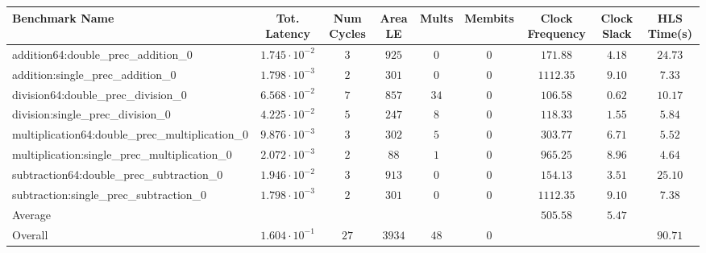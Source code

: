 \begin{tabular}{|l|c|c|c|c|c|c|c|c|}
\hline
Benchmark Name                                   & Tot. Latency            & Num Cycles & Area LE  & Mults  & Membits & Clock Frequency & Clock Slack & HLS Time(s) \\
\hline
addition64:double\_prec\_addition\_0             & $ 1.745 \cdot 10^{-2} $ & $ 3      $ & $ 925  $ & $ 0  $ & $ 0   $ & $ 171.88      $ & $ 4.18    $ & $ 24.73   $ \\
addition:single\_prec\_addition\_0               & $ 1.798 \cdot 10^{-3} $ & $ 2      $ & $ 301  $ & $ 0  $ & $ 0   $ & $ 1112.35     $ & $ 9.10    $ & $ 7.33    $ \\
division64:double\_prec\_division\_0             & $ 6.568 \cdot 10^{-2} $ & $ 7      $ & $ 857  $ & $ 34 $ & $ 0   $ & $ 106.58      $ & $ 0.62    $ & $ 10.17   $ \\
division:single\_prec\_division\_0               & $ 4.225 \cdot 10^{-2} $ & $ 5      $ & $ 247  $ & $ 8  $ & $ 0   $ & $ 118.33      $ & $ 1.55    $ & $ 5.84    $ \\
multiplication64:double\_prec\_multiplication\_0 & $ 9.876 \cdot 10^{-3} $ & $ 3      $ & $ 302  $ & $ 5  $ & $ 0   $ & $ 303.77      $ & $ 6.71    $ & $ 5.52    $ \\
multiplication:single\_prec\_multiplication\_0   & $ 2.072 \cdot 10^{-3} $ & $ 2      $ & $ 88   $ & $ 1  $ & $ 0   $ & $ 965.25      $ & $ 8.96    $ & $ 4.64    $ \\
subtraction64:double\_prec\_subtraction\_0       & $ 1.946 \cdot 10^{-2} $ & $ 3      $ & $ 913  $ & $ 0  $ & $ 0   $ & $ 154.13      $ & $ 3.51    $ & $ 25.10   $ \\
subtraction:single\_prec\_subtraction\_0         & $ 1.798 \cdot 10^{-3} $ & $ 2      $ & $ 301  $ & $ 0  $ & $ 0   $ & $ 1112.35     $ & $ 9.10    $ & $ 7.38    $ \\
\hline
Average                                          & $                     $ & $        $ & $      $ & $    $ & $     $ & $ 505.58      $ & $ 5.47    $ & $         $ \\
\hline
Overall                                          & $ 1.604 \cdot 10^{-1} $ & $ 27     $ & $ 3934 $ & $ 48 $ & $ 0   $ & $             $ & $         $ & $ 90.71   $ \\
\hline
\end{tabular}
